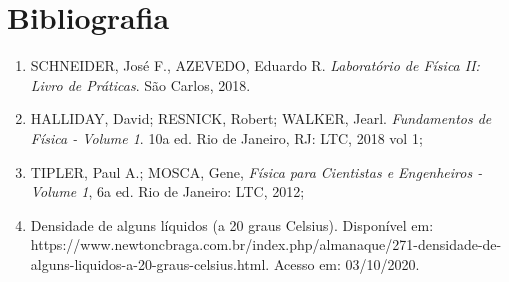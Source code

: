 \newpage
\section{Bibliografia}

\begin{enumerate}
  \item SCHNEIDER, José F., AZEVEDO, Eduardo R. \textit{Laboratório de Física II: Livro de Práticas}. São Carlos, 2018.
  \item HALLIDAY, David; RESNICK, Robert; WALKER, Jearl. \textit{Fundamentos de Física - Volume 1}. 10a ed. Rio de Janeiro, RJ: LTC, 2018 vol 1;
  \item TIPLER, Paul A.; MOSCA, Gene, \textit{Física para Cientistas e Engenheiros - Volume 1}, 6a ed. Rio de Janeiro: LTC, 2012;
  \item Densidade de alguns líquidos (a 20 graus Celsius). Disponível em:\\ https://www.newtoncbraga.com.br/index.php/almanaque/271-densidade-de-alguns-liquidos-a-20-graus-celsius.html. Acesso em: 03/10/2020.
\end{enumerate}


